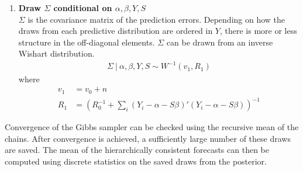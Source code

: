 \documentclass[a4paper,fleqn,11pt]{article}
\begin{document}
\begin{enumerate}
\item \textbf{Draw $\Sigma$ conditional on $\alpha,\beta,Y,S$}\\
$\Sigma$ is the covariance matrix of the prediction errors. Depending on how the draws from each predictive distribution are ordered in $Y$, there is more or less structure in the off-diagonal elements. $\Sigma$ can be drawn from an inverse Wishart distribution.
\begin{align}
\Sigma\ |\ \alpha,\beta,Y,S \sim W^{-1}(v_1,R_1)
\end{align}
where
\begin{align*}
v_1 &= v_0 + n\\
R_1 &=  \left( R_0^{-1} + \sum_i (Y_i - \alpha - S \beta)'(Y_i - \alpha - S \beta) \right)^{-1}
\end{align*}


\end{enumerate}

\noindent Convergence of the Gibbs sampler can be checked using the recursive mean of the chains. After convergence is achieved, a sufficiently large number of these draws are saved. The mean of the hierarchically consistent forecasts can then be computed using discrete statistics on the saved draws from the posterior.\\
\end{document}

